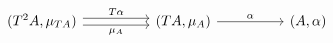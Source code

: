 \[\begin{tikzcd}
	{(T^{2}A,\mu_{TA})} && {(TA,\mu_{A})} && {(A,\alpha)}
	\arrow["\alpha", from=1-3, to=1-5]
	\arrow["T\alpha", shift left, from=1-1, to=1-3]
	\arrow["{\mu_{A}}"', shift right, from=1-1, to=1-3]
\end{tikzcd}\]